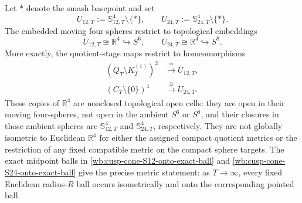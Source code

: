 \begin{corollary}
\label{wb:cusp-cone-literal-R4-open-cells}

Let \(*\) denote the smash basepoint and set
\[
 U_{12,T}:=\mathbb S_{12,T}^4\setminus\{*\},
 \qquad
 U_{24,T}:=\mathbb S_{24,T}^4\setminus\{*\}.
\]
The embedded moving four-spheres restrict to topological embeddings
\[
 U_{12,T}\cong\mathbb R^4\hookrightarrow S^6,
 \qquad
 U_{24,T}\cong\mathbb R^4\hookrightarrow S^8.
\]
More exactly, the quotient-stage maps restrict to homeomorphisms
\begin{align}
 (Q_T\setminus K_T^{(1)})^2
 &\xrightarrow{\ \cong\ }U_{12,T},
 \label{wb:cusp-cone-U12-homeomorphism}\\
 (C_T\setminus\{0\})^4
 &\xrightarrow{\ \cong\ }U_{24,T}.
 \label{wb:cusp-cone-U24-homeomorphism}
\end{align}
These copies of \(\mathbb R^4\) are nonclosed topological open cells: they
are open in their moving four-spheres, not open in the ambient \(S^6\) or
\(S^8\), and their closures in those ambient spheres are
\(\mathbb S_{12,T}^4\) and \(\mathbb S_{24,T}^4\), respectively.  They are
not globally isometric to Euclidean \(\mathbb R^4\) for either the assigned
compact quotient metrics or the restriction of any fixed compatible metric
on the compact sphere targets.  The exact midpoint balls in
\cref{wb:cusp-cone-S12-onto-exact-ball} and \cref{wb:cusp-cone-S24-onto-exact-ball} give the
precise metric statement: as \(T\to\infty\), every fixed Euclidean
radius-\(R\) ball occurs isometrically and onto the corresponding pointed
ball.
\end{corollary}



